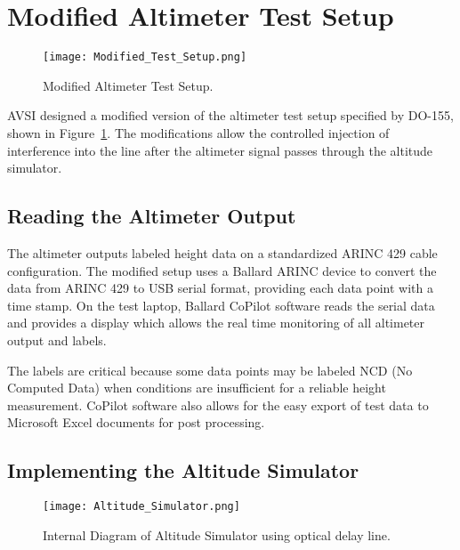 \section{Modified Altimeter Test Setup} \label{sec:Modified}
\begin{figure}[ht]
\centering
\texttt{[image: Modified\_Test\_Setup.png]}
\caption{Modified Altimeter Test Setup.}
\label{fig:Modified}

\end{figure}
AVSI designed a modified version of the altimeter test setup specified by DO-155, shown in Figure~\ref{fig:Modified}. The modifications allow the controlled injection of interference into the line after the altimeter signal passes  through the altitude simulator. 


\subsection{Reading the Altimeter Output}\label{sub:reading_out}
The altimeter outputs labeled height data on a standardized ARINC 429 cable configuration. The modified setup uses a Ballard ARINC device to convert the data from ARINC 429 to USB serial format, providing each data point with a time stamp. On the test laptop, Ballard CoPilot software reads the serial data and provides a display which allows the real time monitoring of all altimeter output and labels. 

The labels are critical because some data points may be labeled NCD (No Computed Data) when conditions are insufficient for a reliable height measurement. CoPilot software also allows for the easy export of test data to Microsoft Excel documents for post processing. 
\subsection{Implementing the Altitude Simulator}\label{sub:Implementing}

\begin{figure}[ht]
\centering
\texttt{[image: Altitude\_Simulator.png]}
\caption{Internal Diagram of Altitude Simulator using optical delay line.}

\label{fig:Altitude_Simulator}

\end{figure}

